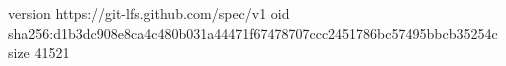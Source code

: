 version https://git-lfs.github.com/spec/v1
oid sha256:d1b3dc908e8ca4c480b031a44471f67478707ccc2451786bc57495bbcb35254c
size 41521
